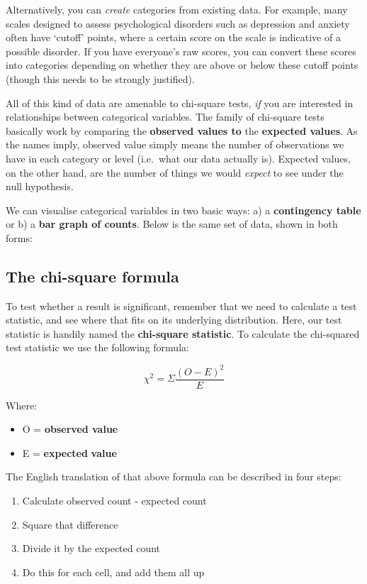 \documentclass[
]{book}
\begin{document}
Alternatively, you can \emph{create} categories from existing data. For example, many scales designed to assess psychological disorders such as depression and anxiety often have `cutoff' points, where a certain score on the scale is indicative of a possible disorder. If you have everyone's raw scores, you can convert these scores into categories depending on whether they are above or below these cutoff points (though this needs to be strongly justified).

All of this kind of data are amenable to chi-square tests, \emph{if} you are interested in relationships between categorical variables. The family of chi-square tests basically work by comparing the \textbf{observed values to} the \textbf{expected values}. As the names imply, observed value simply means the number of observations we have in each category or level (i.e.~what our data actually is). Expected values, on the other hand, are the number of things we would \emph{expect} to see under the null hypothesis.

We can visualise categorical variables in two basic ways: a) a \textbf{contingency table} or b) a \textbf{bar graph of counts}. Below is the same set of data, shown in both forms:

\subsection{The chi-square formula}\label{the-chi-square-formula}

To test whether a result is significant, remember that we need to calculate a test statistic, and see where that fits on its underlying distribution. Here, our test statistic is handily named the \textbf{chi-square statistic}. To calculate the chi-squared test statistic we use the following formula:

\[
\chi^2 = \Sigma \frac{(O-E)^2}{E}
\]

Where:

\begin{itemize}
\item
  O = \textbf{observed value}
\item
  E = \textbf{expected} \textbf{value}
\end{itemize}

The English translation of that above formula can be described in four steps:

\begin{enumerate}
\def\labelenumi{\arabic{enumi}.}
\item
  Calculate observed count - expected count
\item
  Square that difference
\item
  Divide it by the expected count
\item
  Do this for each cell, and add them all up
\end{enumerate}
\end{document}
